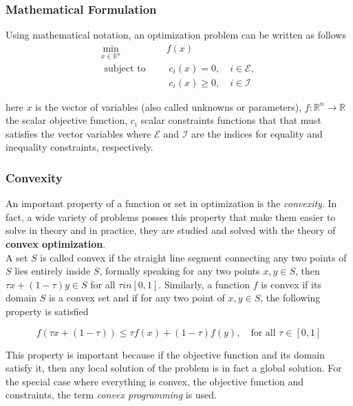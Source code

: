 \subsubsection{Mathematical Formulation}

Using mathematical notation, an optimization problem can be written as follows
\begin{equation}\label{math_opt}
\begin{aligned}
\underset{ x \in \mathbb{R}^n}{\text{min}} &\quad   f(x)\\
    \text { subject to }  & \quad  \;   c_i(x)=0, \quad i \in \mathcal{E} \text {, }\\
    & \quad  \; c_i(x) \geq 0, \quad i \in \mathcal{I}
\end{aligned}
\end{equation}

here $x$ is the vector of variables (also called unknowns or parameters), $f:\mathbb{R}^n\to\mathbb{R}$ the scalar objective function, $c_i$ scalar constraints  functions that that must satisfies the vector variables where $\mathcal{E}$ and $\mathcal{I}$ are the indices for equality and inequality constraints, respectively. 

\subsubsection{Convexity}

An important property of a function or set in optimization is the \textit{convexity}. In fact, a wide variety of problems posses this property that make them easier to solve in theory and in practice, they are studied and solved with the theory of \textbf{convex optimization}.\\

A set $S$ is called convex if the straight line segment connecting any two points of $S$ lies entirely inside $S$, formally speaking for any two points $x,y\in S$, then $\tau x +(1-\tau)y \in S$ for all $\tau in [0,1]$. Similarly, a function $f$ is convex if its domain $S$ is a convex set and if for any two point of $x,y \in S$, the following property is satisfied

\begin{equation}\label{convecity}
        f(\tau x+(1-\tau) ) \leq\tau f(x) + (1-\tau)f(y), \quad \text{for all } \tau \in [0,1] 
\end{equation}

This property is important because if the objective function and its domain satisfy it, then any local solution of the problem is in fact a global solution. For the special case where everything is convex, the objective function and constraints, the term \textit{convex programming} is used.


